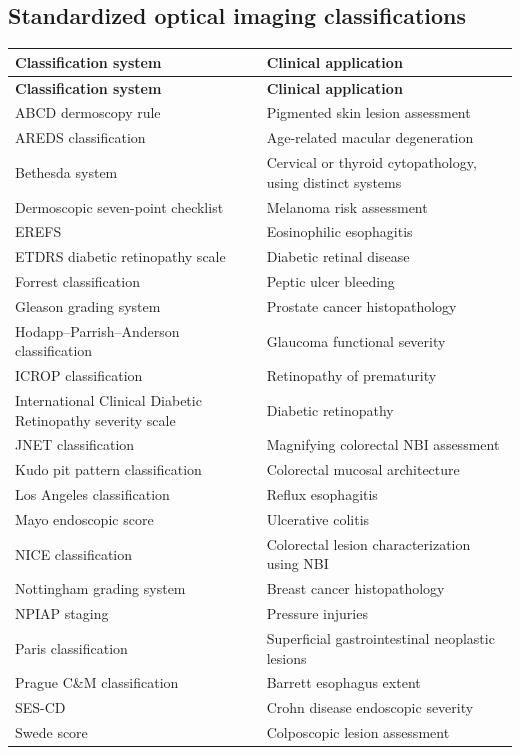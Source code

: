 \subsection{Standardized optical imaging classifications}
\begin{longtable}{@{}p{}p{}@{}}
\toprule
\textbf{Classification system} & \textbf{Clinical application} \\
\midrule
\endfirsthead
\toprule
\textbf{Classification system} & \textbf{Clinical application} \\
\midrule
\endhead
ABCD dermoscopy rule & Pigmented skin lesion assessment \\
AREDS classification & Age-related macular degeneration \\
Bethesda system & Cervical or thyroid cytopathology, using distinct systems \\
Dermoscopic seven-point checklist & Melanoma risk assessment \\
EREFS & Eosinophilic esophagitis \\
ETDRS diabetic retinopathy scale & Diabetic retinal disease \\
Forrest classification & Peptic ulcer bleeding \\
Gleason grading system & Prostate cancer histopathology \\
Hodapp--Parrish--Anderson classification & Glaucoma functional severity \\
ICROP classification & Retinopathy of prematurity \\
International Clinical Diabetic Retinopathy severity scale & Diabetic retinopathy \\
JNET classification & Magnifying colorectal NBI assessment \\
Kudo pit pattern classification & Colorectal mucosal architecture \\
Los Angeles classification & Reflux esophagitis \\
Mayo endoscopic score & Ulcerative colitis \\
NICE classification & Colorectal lesion characterization using NBI \\
Nottingham grading system & Breast cancer histopathology \\
NPIAP staging & Pressure injuries \\
Paris classification & Superficial gastrointestinal neoplastic lesions \\
Prague C\&M classification & Barrett esophagus extent \\
SES-CD & Crohn disease endoscopic severity \\
Swede score & Colposcopic lesion assessment \\
\bottomrule
\end{longtable}

